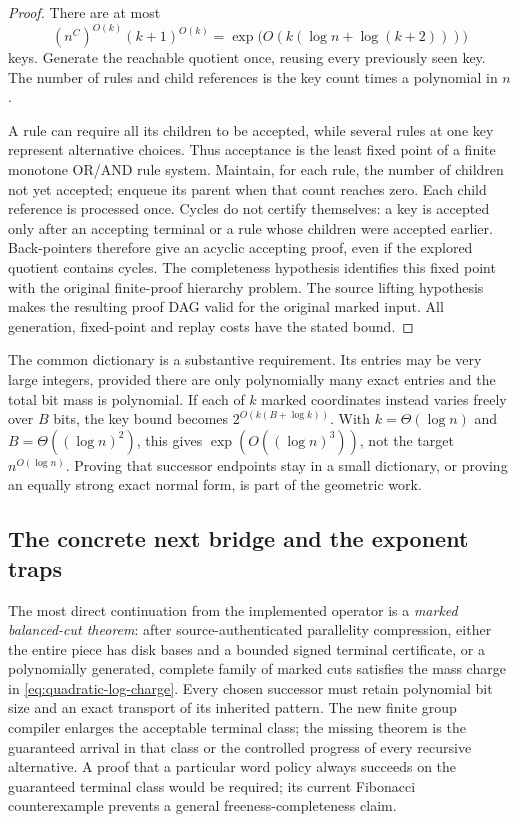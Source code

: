 \begin{proof}
There are at most
\[
 (n^C)^{O(k)}(k+1)^{O(k)}
   =\exp\bigl(O(k(\log n+\log(k+2)))\bigr)
\]
keys.  Generate the reachable quotient once, reusing every previously
seen key.  The number of rules and child references is the key count
times a polynomial in $n$.

A rule can require all its children to be accepted, while several rules
at one key represent alternative choices.  Thus acceptance is the least
fixed point of a finite monotone OR/AND rule system.  Maintain, for each
rule, the number of children not yet accepted; enqueue its parent when
that count reaches zero.  Each child reference is processed once.  Cycles
do not certify themselves: a key is accepted only after an accepting
terminal or a rule whose children were accepted earlier.  Back-pointers
therefore give an acyclic accepting proof, even if the explored quotient
contains cycles.  The completeness hypothesis identifies this fixed
point with the original finite-proof hierarchy problem.  The source
lifting hypothesis makes the resulting proof DAG valid for the original
marked input.  All generation, fixed-point and replay costs have the
stated bound.
\end{proof}

The common dictionary is a substantive requirement.  Its entries may be
very large integers, provided there are only polynomially many exact
entries and the total bit mass is polynomial.  If each of $k$ marked
coordinates instead varies freely over $B$ bits, the key bound becomes
$2^{O(k(B+\log k))}$.  With $k=\Theta(\log n)$ and
$B=\Theta((\log n)^2)$, this gives $\exp(O((\log n)^3))$, not the
target $n^{O(\log n)}$.  Proving that successor endpoints stay in a
small dictionary, or proving an equally strong exact normal form, is
part of the geometric work.

\subsection{The concrete next bridge and the exponent traps}

The most direct continuation from the implemented operator is a
\emph{marked balanced-cut theorem}: after source-authenticated
parallelity compression, either the entire piece has disk bases and a
bounded signed terminal certificate, or a polynomially generated,
complete family of marked cuts satisfies the mass charge in
\eqref{eq:quadratic-log-charge}.  Every chosen successor must retain
polynomial bit size and an exact transport of its inherited pattern.
The new finite group compiler enlarges the acceptable terminal class;
the missing theorem is the guaranteed arrival in that class or the
controlled progress of every recursive alternative.  A proof that a
particular word policy always succeeds on the guaranteed terminal class
would be required; its current Fibonacci counterexample prevents a
general freeness-completeness claim.

